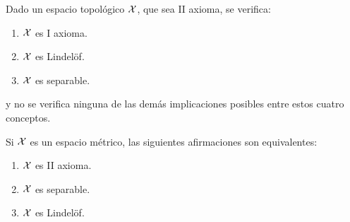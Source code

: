 \begin{prop}
	Dado un espacio topológico $\mathcal{X}$, que sea II axioma, se verifica:
	\begin{enumerate}
		\item $\mathcal{X}$ es I axioma.
		\item $\mathcal{X}$ es Lindelöf.
		\item $\mathcal{X}$ es separable.
	\end{enumerate}
	y no se verifica ninguna de las demás implicaciones posibles entre estos cuatro conceptos.
\end{prop}

\begin{obs}
	Si $\mathcal{X}$ es un espacio métrico, las siguientes afirmaciones son equivalentes:
	\begin{enumerate}
		\item $\mathcal{X}$ es II axioma.
		\item $\mathcal{X}$ es separable.
		\item $\mathcal{X}$ es Lindelöf.
	\end{enumerate}
\end{obs}